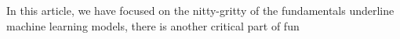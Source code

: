 In this article, we have focused on the nitty-gritty of the fundamentals underline machine learning models, there is another critical part of fun 